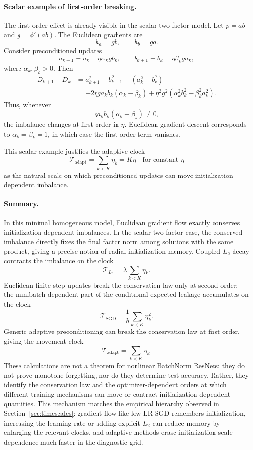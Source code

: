 \documentclass{article}
\begin{document}
\paragraph{Scalar example of first-order breaking.}
The first-order effect is already visible in the scalar two-factor
model. Let \(p=ab\) and \(g=\phi'(ab)\).  The Euclidean gradients are
\[
    h_a=gb,
    \qquad
    h_b=ga.
\]
Consider preconditioned updates
\[
    a_{k+1}=a_k-\eta\alpha_k gb_k,
    \qquad
    b_{k+1}=b_k-\eta\beta_k ga_k,
\]
where \(\alpha_k,\beta_k>0\).  Then
\[
\begin{aligned}
    D_{k+1}-D_k
    &=
    a_{k+1}^2-b_{k+1}^2-(a_k^2-b_k^2) \\
    &=
    -2\eta g a_kb_k(\alpha_k-\beta_k)
    +
    \eta^2g^2
    \left(
        \alpha_k^2 b_k^2-\beta_k^2 a_k^2
    \right).
\end{aligned}
\]
Thus, whenever
\[
    g a_kb_k(\alpha_k-\beta_k)\neq0,
\]
the imbalance changes at first order in \(\eta\).  Euclidean gradient
descent corresponds to \(\alpha_k=\beta_k=1\), in which case the
first-order term vanishes.

This scalar example justifies the adaptive clock
\[
    \mathcal T_{\mathrm{adapt}}
    =
    \sum_{k<K}\eta_k
    =
    K\eta
    \quad\text{for constant \(\eta\)}
\]
as the natural scale on which preconditioned updates can move
initialization-dependent imbalance.

\paragraph{Summary.}
In this minimal homogeneous model, Euclidean gradient flow exactly
conserves initialization-dependent imbalances.  In the scalar two-factor
case, the conserved imbalance directly fixes the final factor norm among
solutions with the same product, giving a precise notion of radial
initialization memory.  Coupled \(L_2\) decay contracts the imbalance on
the clock
\[
    \mathcal T_{L_2}
    =
    \lambda\sum_{k<K}\eta_k.
\]
Euclidean finite-step updates break the conservation law only at second
order; the minibatch-dependent part of the conditional expected leakage
accumulates on the clock
\[
    \mathcal T_{\mathrm{SGD}}
    =
    \frac{1}{b}\sum_{k<K}\eta_k^2.
\]
Generic adaptive preconditioning can break the conservation law at first
order, giving the movement clock
\[
    \mathcal T_{\mathrm{adapt}}
    =
    \sum_{k<K}\eta_k.
\]
These calculations are not a theorem for nonlinear BatchNorm ResNets:
they do not prove monotone forgetting, nor do they determine test
accuracy.  Rather, they identify the conservation law and the
optimizer-dependent orders at which different training mechanisms can
move or contract initialization-dependent quantities.  This mechanism
matches the empirical hierarchy observed in Section~\ref{sec:timescales}:
gradient-flow-like low-LR SGD remembers initialization, increasing the
learning rate or adding explicit \(L_2\) can reduce memory by enlarging
the relevant clocks, and adaptive methods erase initialization-scale
dependence much faster in the diagnostic grid.
\end{document}

